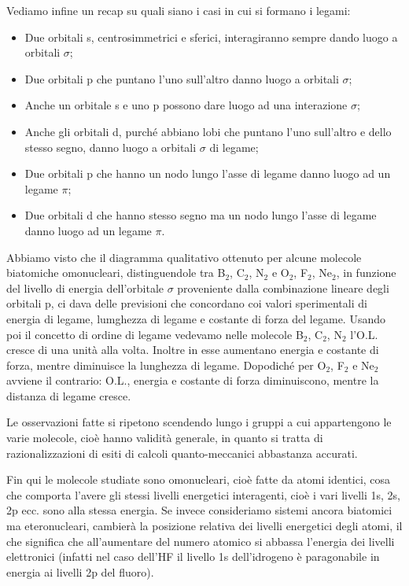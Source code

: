 \vspace{0.2cm}Vediamo infine un recap su quali siano i casi in cui si formano i legami:
\begin{itemize}
    \item Due orbitali s, centrosimmetrici e sferici, interagiranno sempre dando luogo a orbitali $\sigma$; 
    \item Due orbitali p che puntano l'uno sull'altro danno luogo a orbitali $\sigma$;
    \item Anche un orbitale s e uno p possono dare luogo ad una interazione $\sigma$;
    \item Anche gli orbitali d, purché abbiano lobi che puntano l'uno sull'altro e dello stesso segno, danno luogo a orbitali $\sigma$ di legame;
    \item Due orbitali p che hanno un nodo lungo l'asse di legame danno luogo ad un legame $\pi$;
    \item Due orbitali d che hanno stesso segno ma un nodo lungo l'asse di legame danno luogo ad un legame $\pi$.
\end{itemize}

Abbiamo visto che il diagramma qualitativo ottenuto per alcune molecole biatomiche omonucleari, distinguendole tra B$_2$, C$_2$, N$_2$ e O$_2$, F$_2$, Ne$_2$, in funzione del livello di energia dell'orbitale $\sigma$ proveniente dalla combinazione lineare degli orbitali p, ci dava delle previsioni che concordano coi valori sperimentali di energia di legame, lumghezza di legame e costante di forza del legame. Usando poi il concetto di ordine di legame vedevamo nelle molecole B$_2$, C$_2$, N$_2$  l'O.L. cresce di una unità alla volta. Inoltre in esse aumentano energia e costante di forza, mentre diminuisce la lunghezza di legame. Dopodiché per O$_2$, F$_2$ e Ne$_2$ avviene il contrario: O.L., energia e costante di forza diminuiscono, mentre la distanza di legame cresce.

Le osservazioni fatte si ripetono scendendo lungo i gruppi a cui appartengono le varie molecole, cioè hanno validità generale, in quanto si tratta di razionalizzazioni di esiti di calcoli quanto-meccanici abbastanza accurati.

Fin qui le molecole studiate sono omonucleari, cioè fatte da atomi identici, cosa che comporta l'avere gli stessi livelli energetici interagenti, cioè i vari livelli 1s, 2s, 2p ecc. sono alla stessa energia. Se invece consideriamo sistemi ancora biatomici ma eteronucleari, cambierà la posizione relativa dei livelli energetici degli atomi, il che significa che all'aumentare del numero atomico si abbassa l'energia dei livelli elettronici (infatti nel caso dell'HF il livello 1s dell'idrogeno è paragonabile in energia ai livelli 2p del fluoro).

